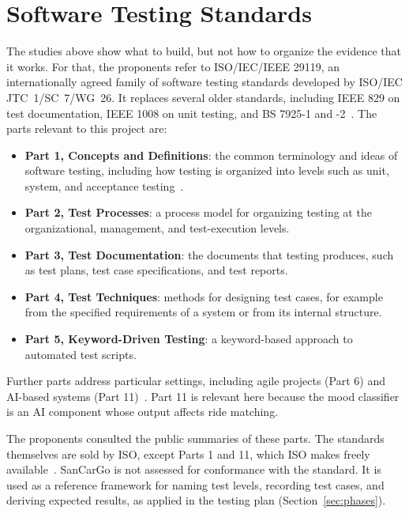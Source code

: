 \section{Software Testing Standards}
\label{sec:standards}
The studies above show what to build, but not how to organize the evidence that it works. For that, the proponents refer to ISO/IEC/IEEE 29119, an internationally agreed family of software testing standards developed by ISO/IEC JTC~1/SC~7/WG~26. It replaces several older standards, including IEEE 829 on test documentation, IEEE 1008 on unit testing, and BS 7925-1 and -2~\cite{iso29119site}. The parts relevant to this project are:

\begin{itemize}
    \item \textbf{Part 1, Concepts and Definitions}: the common terminology and ideas of software testing, including how testing is organized into levels such as unit, system, and acceptance testing~\cite{iso29119p1}.
    \item \textbf{Part 2, Test Processes}: a process model for organizing testing at the organizational, management, and test-execution levels.
    \item \textbf{Part 3, Test Documentation}: the documents that testing produces, such as test plans, test case specifications, and test reports.
    \item \textbf{Part 4, Test Techniques}: methods for designing test cases, for example from the specified requirements of a system or from its internal structure.
    \item \textbf{Part 5, Keyword-Driven Testing}: a keyword-based approach to automated test scripts.
\end{itemize}

Further parts address particular settings, including agile projects (Part 6) and AI-based systems (Part 11)~\cite{iso29119site}. Part 11 is relevant here because the mood classifier is an AI component whose output affects ride matching.

The proponents consulted the public summaries of these parts. The standards themselves are sold by ISO, except Parts 1 and 11, which ISO makes freely available~\cite{iso29119site}. SanCarGo is not assessed for conformance with the standard. It is used as a reference framework for naming test levels, recording test cases, and deriving expected results, as applied in the testing plan (Section~\ref{sec:phases}).

